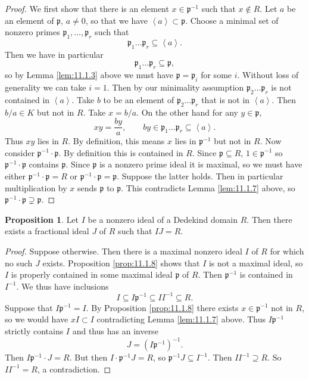 \documentclass{article}
\newcommand{\rb}[1]{\left( #1 \right)}
\newcommand{\ab}[1]{\left\langle #1 \right\rangle}
\theoremstyle{definition}\newtheorem{definition}{Definition}[subsection]
\theoremstyle{definition}\newtheorem{remark}[definition]{Remark}
\theoremstyle{definition}\newtheorem*{example}{Example}
\theoremstyle{definition}\newtheorem*{note}{Note}
\newtheorem{proposition}[definition]{Proposition}
\begin{document}
\begin{proof}
We first show that there is an element $ x \in \mathfrak{p}^{-1} $ such that $ x \notin R $. Let $ a $ be an element of $ \mathfrak{p} $, $ a \ne 0 $, so that we have $ \ab{a} \subset \mathfrak{p} $. Choose a minimal set of nonzero primes $ \mathfrak{p}_1, \dots, \mathfrak{p}_r $ such that
$$ \mathfrak{p}_1 \dots \mathfrak{p}_r \subseteq \ab{a}. $$
Then we have in particular
$$ \mathfrak{p}_1 \dots \mathfrak{p}_r \subseteq \mathfrak{p}, $$
so by Lemma \ref{lem:11.1.3} above we must have $ \mathfrak{p} = \mathfrak{p}_i $ for some $ i $. Without loss of generality we can take $ i = 1 $. Then by our minimality assumption $ \mathfrak{p}_2 \dots \mathfrak{p}_r $ is not contained in $ \ab{a} $. Take $ b $ to be an element of $ \mathfrak{p}_2 \dots \mathfrak{p}_r $ that is not in $ \ab{a} $. Then $ b / a \in K $ but not in $ R $. Take $ x = b / a $. On the other hand for any $ y \in \mathfrak{p} $,
$$ xy = \dfrac{by}{a}, \qquad by \in \mathfrak{p}_1 \dots \mathfrak{p}_r \subseteq \ab{a}. $$
Thus $ xy $ lies in $ R $. By definition, this means $ x $ lies in $ \mathfrak{p}^{-1} $ but not in $ R $. Now consider $ \mathfrak{p}^{-1} \cdot \mathfrak{p} $. By definition this is contained in $ R $. Since $ \mathfrak{p} \subseteq R $, $ 1 \in \mathfrak{p}^{-1} $ so $ \mathfrak{p}^{-1} \cdot \mathfrak{p} $ contains $ \mathfrak{p} $. Since $ \mathfrak{p} $ is a nonzero prime ideal it is maximal, so we must have either $ \mathfrak{p}^{-1} \cdot \mathfrak{p} = R $ or $ \mathfrak{p}^{-1} \cdot \mathfrak{p} = \mathfrak{p} $. Suppose the latter holds. Then in particular multiplication by $ x $ sends $ \mathfrak{p} $ to $ \mathfrak{p} $. This contradicts Lemma \ref{lem:11.1.7} above, so $ \mathfrak{p}^{-1} \cdot \mathfrak{p} \supsetneq \mathfrak{p} $.
\end{proof}

\begin{proposition}
\label{prop:11.1.9}
Let $ I $ be a nonzero ideal of a Dedekind domain $ R $. Then there exists a fractional ideal $ J $ of $ R $ such that $ IJ = R $.
\end{proposition}

\begin{proof}
Suppose otherwise. Then there is a maximal nonzero ideal $ I $ of $ R $ for which no such $ J $ exists. Proposition \ref{prop:11.1.8} shows that $ I $ is not a maximal ideal, so $ I $ is properly contained in some maximal ideal $ \mathfrak{p} $ of $ R $. Then $ \mathfrak{p}^{-1} $ is contained in $ I^{-1} $. We thus have inclusions
$$ I \subseteq I\mathfrak{p}^{-1} \subseteq II^{-1} \subseteq R. $$
Suppose that $ I\mathfrak{p}^{-1} = I $. By Proposition \ref{prop:11.1.8} there exists $ x \in \mathfrak{p}^{-1} $ not in $ R $, so we would have $ xI \subset I $ contradicting Lemma \ref{lem:11.1.7} above. Thus $ I\mathfrak{p}^{-1} $ strictly contains $ I $ and thus has an inverse
$$ J = \rb{I\mathfrak{p}^{-1}}^{-1}. $$
Then $ I\mathfrak{p}^{-1} \cdot J = R $. But then $ I \cdot \mathfrak{p}^{-1}J = R $, so $ \mathfrak{p}^{-1}J \subseteq I^{-1} $. Then $ II^{-1} \supseteq R $. So $ II^{-1} = R $, a contradiction.
\end{proof}
\end{document}

